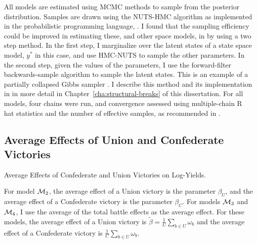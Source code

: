 All models are estimated using MCMC methods to sample from the posterior distribution.
Samples are drawn using the NUTS-HMC algorithm \parencite{HoffmanGelman2013} as implemented in the probabilistic programming language, \Stan{} \parencites{Stan2015a}.
I found that the sampling efficiency could be improved in estimating these, and other space models, in \Stan{} by using a two step method.
In the first step, I marginalize over the latent states of a state space model,  $y^{*}$ in this case, and use HMC-NUTS to sample the other parameters.
In the second step, given the values of the parameters, I use the forward-filter backwards-sample algorithm to sample the latent states.
This is an example of a partially collapsed Gibbs sampler \parencite{VanDykPark2008a}.
I describe this method and its implementation in \Stan{} in more detail in Chapter~\ref{cha:structural-breaks} of this dissertation.
For all models, four chains were run, and convergence assessed using multiple-chain R hat statistics and the number of effective samples, as recommended in \parencites{Stan2015a}.




\subsection{Average Effects of Union and Confederate Victories}
\label{sec:future-battles}

\begin{table}
  \centering
  
  \caption{Average Effects of Confederate and Union Victories on Log-Yields.}
  \label{bonds:tab:avg_battle_effects}
\end{table}

For model $\mathcal{M}_{\text{2}}$, the average effect of a Union victory is the parameter $\beta_{U}$, and the average effect of a Confederate victory is the parameter $\beta_{C}$. 
For models $\mathcal{M}_{\text{3}}$ and $\mathcal{M}_{\text{4}}$, I use the average of the total battle effects as the average effect.
For these models, the average effect of a Union victory is $\tilde{\beta} = \frac{1}{U}\sum_{b \in U} \omega_{b}$ and the average effect of a Confederate victory is $\frac{1}{C}\sum_{b \in U} \omega_{b}$. 

